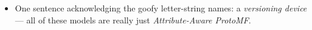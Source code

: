 \begin{itemize}
    \item One sentence acknowledging the goofy letter-string names: a \emph{versioning device} — all of these models are really just \emph{Attribute-Aware ProtoMF}. 

\end{itemize}
